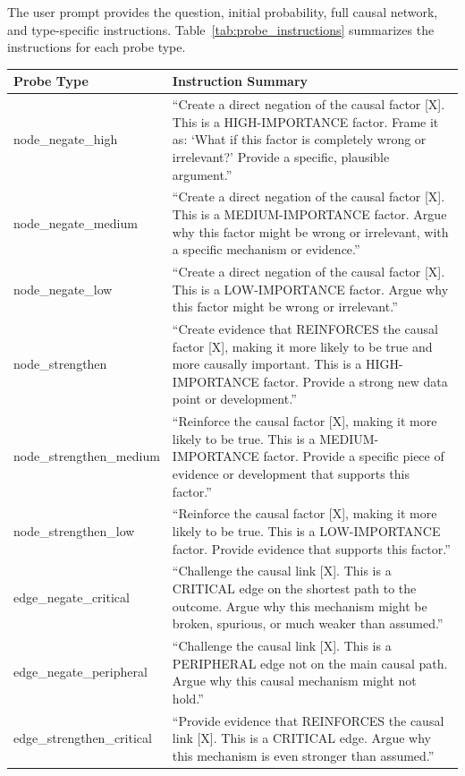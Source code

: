 \documentclass[11pt]{article}
\begin{document}
The user prompt provides the question, initial probability, full causal network, and type-specific instructions. Table~\ref{tab:probe_instructions} summarizes the instructions for each probe type.

\begin{table}[t]
\centering
\small
\begin{tabular}{lp{12cm}}
\toprule
\textbf{Probe Type} & \textbf{Instruction Summary} \\
\midrule
node\_negate\_high & ``Create a direct negation of the causal factor [X]. This is a HIGH-IMPORTANCE factor. Frame it as: `What if this factor is completely wrong or irrelevant?' Provide a specific, plausible argument.'' \\
node\_negate\_medium & ``Create a direct negation of the causal factor [X]. This is a MEDIUM-IMPORTANCE factor. Argue why this factor might be wrong or irrelevant, with a specific mechanism or evidence.'' \\
node\_negate\_low & ``Create a direct negation of the causal factor [X]. This is a LOW-IMPORTANCE factor. Argue why this factor might be wrong or irrelevant.'' \\
node\_strengthen & ``Create evidence that REINFORCES the causal factor [X], making it more likely to be true and more causally important. This is a HIGH-IMPORTANCE factor. Provide a strong new data point or development.'' \\
node\_strengthen\_medium & ``Reinforce the causal factor [X], making it more likely to be true. This is a MEDIUM-IMPORTANCE factor. Provide a specific piece of evidence or development that supports this factor.'' \\
node\_strengthen\_low & ``Reinforce the causal factor [X], making it more likely to be true. This is a LOW-IMPORTANCE factor. Provide evidence that supports this factor.'' \\
edge\_negate\_critical & ``Challenge the causal link [X]. This is a CRITICAL edge on the shortest path to the outcome. Argue why this mechanism might be broken, spurious, or much weaker than assumed.'' \\
edge\_negate\_peripheral & ``Challenge the causal link [X]. This is a PERIPHERAL edge not on the main causal path. Argue why this causal mechanism might not hold.'' \\
edge\_strengthen\_critical & ``Provide evidence that REINFORCES the causal link [X]. This is a CRITICAL edge. Argue why this mechanism is even stronger than assumed.'' \\

\end{tabular}
\end{table}
\end{document}
